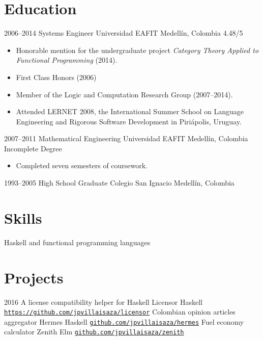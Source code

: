\documentclass[12pt,letterpaper,sans]{moderncv}
\begin{document}
\section{Education}

\cventry
  {2006--2014}
  {Systems Engineer}
  {Universidad EAFIT}
  {Medellín, Colombia}
  {4.48/5}
  {
    \begin{itemize}
      \item
        Honorable mention for the undergraduate project \emph{Category
        Theory Applied to Functional Programming} (2014).
      \item
        First Class Honors (2006)
      \item
        Member of the Logic and Computation Research Group
        (2007--2014).
      \item
        Attended LERNET 2008, the International Summer School on
        Language Engineering and Rigorous Software Development in
        Piriápolis, Uruguay.
    \end{itemize}
  }
\cventry
  {2007--2011}
  {Mathematical Engineering}
  {Universidad EAFIT}
  {Medellín, Colombia}
  {Incomplete Degree}
  {
    \begin{itemize}
    \item
      Completed seven semesters of coursework.
    \end{itemize}
  }
\cventry
  {1993--2005}
  {High School Graduate}
  {Colegio San Ignacio}
  {Medellín, Colombia}
  {}
  {}

\section{Skills}

  {Haskell and functional programming languages}

\section{Projects}

\cventry
  {2016}
  {A license compatibility helper for Haskell}
  {Licensor}
  {Haskell}
  {}
  {
    \href{https://github.com/jpvillaisaza/licensor}
    {\texttt{https://github.com/jpvillaisaza/licensor}}
  }
\cventry
  {}
  {Colombian opinion articles aggregator}
  {Hermes}
  {Haskell}
  {}
  {
    \href{https://github.com/jpvillaisaza/hermes}
      {\texttt{github.com/jpvillaisaza/hermes}}
  }
\cventry
  {}
  {Fuel economy calculator}
  {Zenith}
  {Elm}
  {}
  {
    \href{https://github.com/jpvillaisaza/zenith}
      {\texttt{github.com/jpvillaisaza/zenith}}
  }
\end{document}
